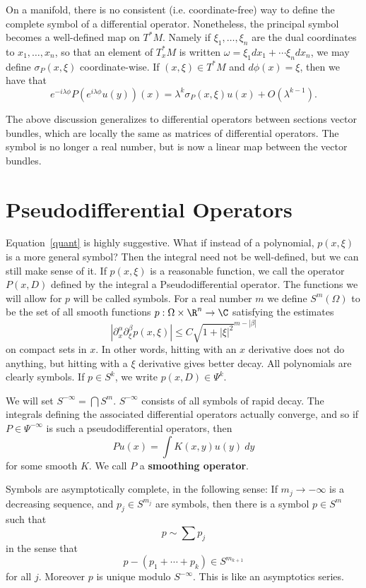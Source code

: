 \documentclass[12pt]{article}
\begin{document}
On a manifold, there is no consistent (i.e. coordinate-free) way to define the complete symbol of a differential operator. Nonetheless, the principal symbol becomes a well-defined map on $T^\ast M$. Namely if $\xi_1,\ldots,\xi_n$ are the dual coordinates to $x_1,\ldots, x_n$, so that an element of $T^\ast_xM$ is written $\omega = \xi_1dx_1+\cdots \xi_n dx_n$, we may define $\sigma_P(x,\xi)$ coordinate-wise. If $(x,\xi) \in T^\ast M$ and $d\phi(x) = \xi$, then we have that
\[e^{-i\lambda \phi}P(e^{i\lambda\phi}u(y))(x) = \lambda^k\sigma_P(x,\xi)u(x) + O(\lambda^{k-1}).\]

The above discussion generalizes to differential operators between sections vector bundles, which are locally the same as matrices of differential operators. The symbol is no longer a real number, but is now a linear map between the vector bundles.

\section{Pseudodifferential Operators}
Equation~\ref{quant} is highly suggestive. What if instead of a polynomial, $p(x,\xi)$ is a more general symbol? Then the integral need not be well-defined, but we can still make sense of it. If $p(x,\xi)$ is a reasonable function, we call the operator $P(x,D)$ defined by the integral a Pseudodifferential operator. The functions we will allow for $p$ will be called symbols. For a real number $m$ we define $S^m(\Omega)$ to be the set of all smooth functions $p:\Omega\times \R^n \to \C$ satisfying the estimates
\[|\partial^\alpha_x\partial^\beta_\xi p(x,\xi)| \leq C\sqrt{1+|\xi|^2}^{m-|\beta|}\] on compact sets in $x$. In other words, hitting with an $x$ derivative does not do anything, but hitting with a $\xi$ derivative gives better decay. All polynomials are clearly symbols. If $p \in S^k$, we write $p(x,D) \in \Psi^k$.

We will set $S^{-\infty} = \bigcap S^m$. $S^{-\infty}$ consists of all symbols of rapid decay. The integrals defining the associated differential operators actually converge, and so if $P \in \Psi^{-\infty}$ is such a pseudodifferential operators, then
\[Pu(x) = \int K(x,y)u(y)\ dy\] for some smooth $K$. We call $P$ a \textbf{smoothing operator}.

Symbols are asymptotically complete, in the following sense: If $m_j \to -\infty$ is a decreasing sequence, and $p_j \in S^{m_j}$ are symbols, then there is a symbol $p \in S^m$ such that
\[p \sim \sum p_j\] in the sense that
\[p-(p_1+\cdots + p_k) \in S^{m_{k+1}}\] for all $j$. Moreover $p$ is unique modulo $S^{-\infty}$. This is like an asymptotics series.
\end{document}
